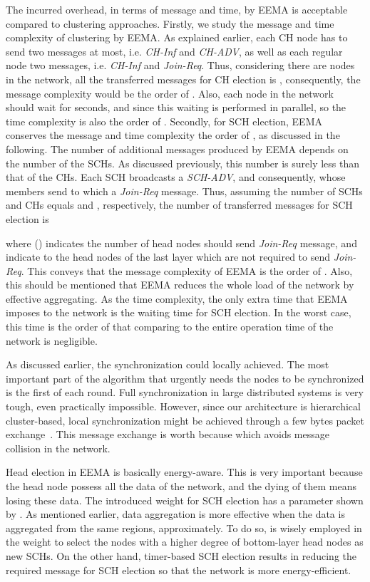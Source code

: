 \documentclass[journal]{IEEEtran}
\begin{document}
The incurred overhead, in terms of message and time, by EEMA is acceptable compared to clustering approaches.  Firstly, we study the message and time complexity of clustering by EEMA.  As explained earlier, each CH node has to send two messages at most, i.e. {\it CH-Inf} and {\it CH-ADV}, as well as each regular node two messages, i.e. {\it CH-Inf} and {\it Join-Req}.  Thus, considering there are  nodes in the network, all the transferred messages for CH election is , consequently, the message complexity would be the order of .  Also, each node in the network should wait for  seconds, and since this waiting is performed in parallel, so the time complexity is also the order of .  Secondly, for SCH election, EEMA conserves the message and time complexity the order of , as discussed in the following.  The number of additional messages produced by EEMA depends on the number of the SCHs.  As discussed previously, this number is surely less than that of the CHs.  Each SCH broadcasts a {\it SCH-ADV}, and consequently, whose members send to which a {\it Join-Req} message.  Thus, assuming the number of SCHs and CHs equals  and , respectively, the number of transferred messages for SCH election is
 
where () indicates the number of head nodes should send {\it Join-Req} message, and  indicate to the head nodes of the last layer which are not required to send {\it Join-Req}.  This conveys that the message complexity of EEMA is the order of .  Also, this should be mentioned that EEMA reduces the whole load of the network by effective aggregating.  As the time complexity, the only extra time that EEMA imposes to the network is the waiting time for SCH election.  In the worst case, this time is the order of  that comparing to the entire operation time of the network is negligible.  

As discussed earlier, the synchronization could locally achieved.  The most important part of the algorithm that urgently needs the nodes to be synchronized is the first of each round.  Full synchronization in large distributed systems is very tough, even practically impossible.  However, since our architecture is hierarchical cluster-based, local synchronization might be achieved through a few bytes packet exchange~\cite{zhu}.  This message exchange is worth because which avoids message collision in the network.

Head election in EEMA is basically energy-aware.  This is very important because the head node possess all the data of the network, and the dying of them means losing these data.  The introduced weight for SCH election has a parameter shown by .  As mentioned earlier, data aggregation is more effective when the data is aggregated from the same regions, approximately.  To do so,  is wisely employed in the weight to select the nodes with a higher degree of bottom-layer head nodes as new SCHs.  On the other hand, timer-based SCH election results in reducing the required message for SCH election so that the network is more energy-efficient.
\end{document}
